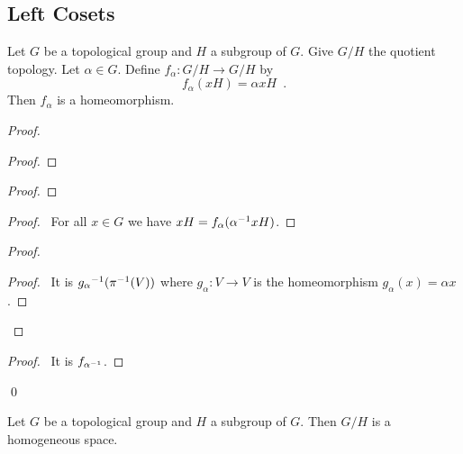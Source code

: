 \subsection{Left Cosets}

\begin{prop}
Let $G$ be a topological group and $H$ a subgroup of $G$. Give $G/H$ the quotient topology. Let $\alpha \in G$. Define $f_\alpha : G/H \rightarrow G/H$ by
\[ f_\alpha(xH) = \alpha x H \enspace . \]
Then $f_\alpha$ is a homeomorphism.
\end{prop}

\begin{proof}
\pf
{}
\begin{proof}
\end{proof}
\begin{proof}
\end{proof}
\begin{proof}
	\pf\ For all $x \in G$ we have $xH = f_\alpha({\alpha}^{-1} x H)$.
\end{proof}
\begin{proof}
	\begin{proof}
		\pf\ It is ${g_\alpha}^{-1}({\pi}^{-1}(V))$ where $g_\alpha : V \rightarrow V$ is the homeomorphism $g_\alpha(x) = \alpha x$.
	\end{proof}
\end{proof}
\begin{proof}
	\pf\ It is $f_{{\alpha}^{-1}}$.
\end{proof}
\qed
\end{proof}

\begin{cor}
Let $G$ be a topological group and $H$ a subgroup of $G$. Then $G/H$ is a homogeneous space.
\end{cor}

